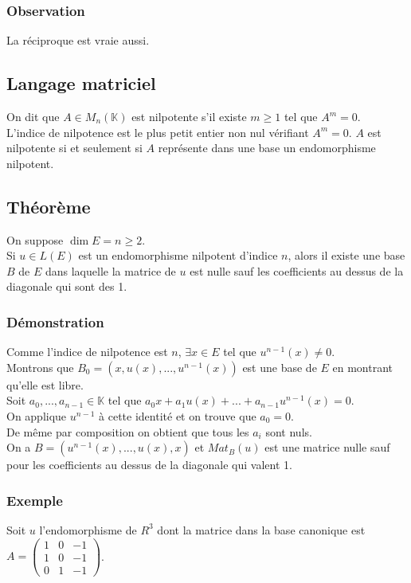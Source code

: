 \documentclass[a4paper,10pt]{book} %
\newcommand{\K}{\mathbb{K}}
\begin{document}
\subsubsection{Observation}
La réciproque est vraie aussi.

\subsection{Langage matriciel}
On dit que $A\in M_n(\K)$ est nilpotente s'il existe $m\geq 1$ tel que $A^m=0$.\\

L'indice de nilpotence est le plus petit entier non nul vérifiant $A^m=0$. $A$ est nilpotente si et seulement si $A$ représente dans une base un endomorphisme nilpotent.

\newpage

\subsection{Théorème}
On suppose $\dim E=n\geq 2$.\\
Si $u\in L(E)$ est un endomorphisme nilpotent d'indice $n$, alors il existe une base $B$ de $E$ dans laquelle la matrice de $u$ est nulle sauf les coefficients au dessus de la diagonale qui sont des 1.

\subsubsection{Démonstration}
Comme l'indice de nilpotence est $n$, $\exists x\in E$ tel que $u^{n-1}(x)\neq 0$.\\
Montrons que $B_0=(x,u(x),...,u^{n-1}(x))$ est une base de $E$ en montrant qu'elle est libre.\\

Soit $a_0,...,a_{n-1}\in \K$ tel que $a_0x+a_1u(x)+...+a_{n-1}u^{n-1}(x)=0$.\\

On applique $u^{n-1}$ à cette identité et on trouve que $a_0=0$.\\

De même par composition on obtient que tous les $a_i$ sont nuls.\\

On a $B=(u^{n-1}(x),...,u(x),x)$ et $Mat_B(u)$ est une matrice nulle sauf pour les coefficients au dessus de la diagonale qui valent 1.

\subsubsection{Exemple}
Soit $u$ l'endomorphisme de $R^3$ dont la matrice dans la base canonique est $A=\begin{pmatrix}
1&0&-1\\1&0&-1\\0&1&-1
\end{pmatrix}$.\\
\end{document}
